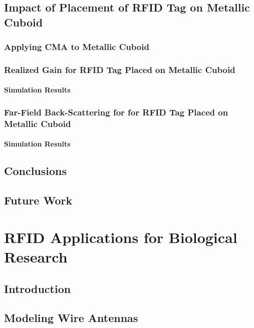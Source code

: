 \documentclass[12pt,onecolumn]{report}
\begin{document}
    \section{Impact of Placement of RFID Tag on Metallic Cuboid}
        \subsection{Applying CMA to Metallic Cuboid}
        \subsection{Realized Gain for RFID Tag Placed on Metallic Cuboid}
            \subsubsection{Simulation Results}
        \subsection{Far-Field Back-Scattering for for RFID Tag Placed on Metallic Cuboid}
            \subsubsection{Simulation Results}
    \section{Conclusions}
    \section{Future Work}
    
\chapter{RFID Applications for Biological Research}
    \section{Introduction}
        
    \section{Modeling Wire Antennas}
\end{document}
